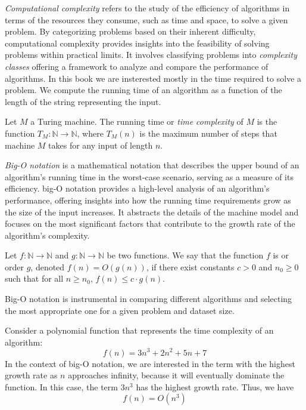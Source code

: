 \emph{Computational complexity} refers to the study of the efficiency of algorithms in terms of the resources they consume, such as time and space, to solve a given problem. By categorizing problems based on their inherent difficulty, computational complexity provides insights into the feasibility of solving problems within practical limits. It involves classifying problems into \emph{complexity classes} offering a framework to analyze and compare the performance of algorithms. In this book we are insterested mostly in the time required to solve a problem. We compute the running time of an algorithm as a function of the length of the string representing the input.

\begin{definition}
Let $M$ a Turing machine. The running time or \emph{time complexity} of $M$ is the function $T_M:\mathbb{N} \to \mathbb{N}$, where $T_M(n)$ is the maximum number of steps that machine $M$ takes for any input of length $n$.
\end{definition}

\emph{Big-O notation} is a mathematical notation that describes the upper bound of an algorithm's running time in the worst-case scenario, serving as a measure of its efficiency. big-O notation provides a high-level analysis of an algorithm's performance, offering insights into how the running time requirements grow as the size of the input increases. It abstracts the details of the machine model and focuses on the most significant factors that contribute to the growth rate of the algorithm's complexity.

\begin{definition}
Let $f:\mathbb{N} \to \mathbb{N}$ and $g:\mathbb{N} \to \mathbb{N}$ be two functions. We say that the function $f$ is or order $g$, denoted \(f(n) = O(g(n))\), if there exist constants \(c > 0\) and \(n_0 \geq 0\) such that for all \(n \geq n_0\), \(f(n) \leq c \cdot g(n)\).
\end{definition}

Big-O notation is instrumental in comparing different algorithms and selecting the most appropriate one for a given problem and dataset size.

\begin{example}
Consider a polynomial function that represents the time complexity of an algorithm:
\[
f(n) = 3n^3 + 2n^2 + 5n + 7
\]
In the context of big-O notation, we are interested in the term with the highest growth rate as \(n\) approaches infinity, because it will eventually dominate the function. In this case, the term \(3n^3\) has the highest growth rate. Thus, we have
\[
f(n) = O(n^3)
\]
\end{example}

